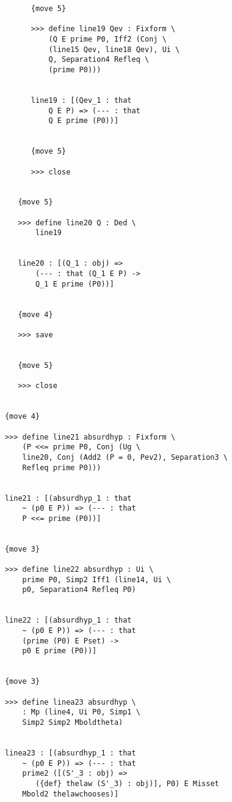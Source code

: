 \documentclass[12pt]{article}
\begin{document}
\begin{verbatim}
                  {move 5}

                  >>> define line19 Qev : Fixform \
                      (Q E prime P0, Iff2 (Conj \
                      (line15 Qev, line18 Qev), Ui \
                      Q, Separation4 Refleq \
                      (prime P0)))


                  line19 : [(Qev_1 : that 
                      Q E P) => (--- : that 
                      Q E prime (P0))]


                  {move 5}

                  >>> close


               {move 5}

               >>> define line20 Q : Ded \
                   line19


               line20 : [(Q_1 : obj) => 
                   (--- : that (Q_1 E P) -> 
                   Q_1 E prime (P0))]


               {move 4}

               >>> save


               {move 5}

               >>> close


            {move 4}

            >>> define line21 absurdhyp : Fixform \
                (P <<= prime P0, Conj (Ug \
                line20, Conj (Add2 (P = 0, Pev2), Separation3 \
                Refleq prime P0)))


            line21 : [(absurdhyp_1 : that 
                ~ (p0 E P)) => (--- : that 
                P <<= prime (P0))]


            {move 3}

            >>> define line22 absurdhyp : Ui \
                prime P0, Simp2 Iff1 (line14, Ui \
                p0, Separation4 Refleq P0)


            line22 : [(absurdhyp_1 : that 
                ~ (p0 E P)) => (--- : that 
                (prime (P0) E Pset) -> 
                p0 E prime (P0))]


            {move 3}

            >>> define linea23 absurdhyp \
                : Mp (line4, Ui P0, Simp1 \
                Simp2 Simp2 Mboldtheta)


            linea23 : [(absurdhyp_1 : that 
                ~ (p0 E P)) => (--- : that 
                prime2 ([(S'_3 : obj) => 
                   ({def} thelaw (S'_3) : obj)], P0) E Misset 
                Mbold2 thelawchooses)]



\end{verbatim}
\end{document}
